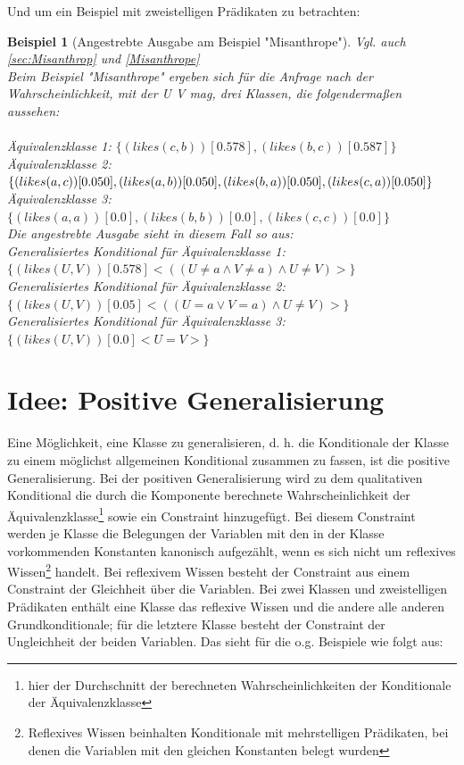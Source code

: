 \documentclass[a4paper, 11pt]{book}
\newtheorem{Bsp}{Beispiel}[section]
\begin{document}
Und um ein Beispiel mit zweistelligen Prädikaten zu betrachten: 

	\label{Ausgabe_Misanthrope}
	\begin{Bsp}[Angestrebte Ausgabe am Beispiel "{}Misanthrope"{}]
		Vgl. auch \\ \ref{sec:Misanthrop} und \ref{Misanthrope}\\
		Beim Beispiel "{}Misanthrope"{} ergeben sich für die Anfrage nach der Wahrscheinlichkeit, mit der U V mag, drei Klassen, die folgendermaßen aussehen:\\
		\\
		Äquivalenzklasse 1: $ \{(likes(c,b))[0.578], (likes(b,c))[0.587]\} $\\
		Äquivalenzklasse 2: $ \{(likes(a,c))[0.050], (likes(a,b))[0.050], (likes(b,a))[0.050],\\
		 (likes(c,a))[0.050]\} $\\
		Äquivalenzklasse 3: $ \{(likes(a,a))[0.0], (likes(b,b))[0.0], (likes(c,c))[0.0]\} $\\
		
		\noindent
		Die angestrebte Ausgabe sieht in diesem Fall so aus:\\
		Generalisiertes Konditional für Äquivalenzklasse 1: $ \{(likes(U,V))[0.578] <((U \neq a \land V \neq a) \land U \neq V)>\} $\\
		Generalisiertes Konditional für Äquivalenzklasse 2: $ \{(likes(U,V))[0.05] <((U = a \lor V = a) \land U \neq V)>\} $\\
		Generalisiertes Konditional für Äquivalenzklasse 3: $ \{(likes(U,V))[0.0] <U = V>\} $\\
			\end{Bsp}


\section{Idee: Positive Generalisierung}
\label{PositiveGeneralisierung}

Eine Möglichkeit, eine Klasse zu generalisieren, d. h. die Konditionale der Klasse zu einem möglichst allgemeinen Konditional zusammen zu fassen, ist die positive Generalisierung. Bei der positiven Generalisierung wird zu dem qualitativen  Konditional die durch die Komponente berechnete Wahrscheinlichkeit der Äquivalenzklasse\footnote{hier der Durchschnitt der berechneten Wahrscheinlichkeiten der Konditionale der Äquivalenzklasse} sowie ein Constraint hinzugefügt. Bei diesem Constraint werden je Klasse die Belegungen der Variablen mit den in der Klasse vorkommenden Konstanten kanonisch aufgezählt, wenn es sich nicht um reflexives Wissen\footnote{Reflexives Wissen beinhalten Konditionale mit mehrstelligen Prädikaten, bei denen die Variablen mit den gleichen Konstanten belegt wurden} handelt. Bei reflexivem Wissen besteht der Constraint aus einem Constraint der Gleichheit über die Variablen. Bei zwei Klassen und zweistelligen Prädikaten enthält eine Klasse das reflexive Wissen und die andere alle anderen Grundkonditionale; für die letztere Klasse besteht der Constraint der Ungleichheit der beiden Variablen. 
Das sieht für die o.g. Beispiele wie folgt aus:
\end{document}
